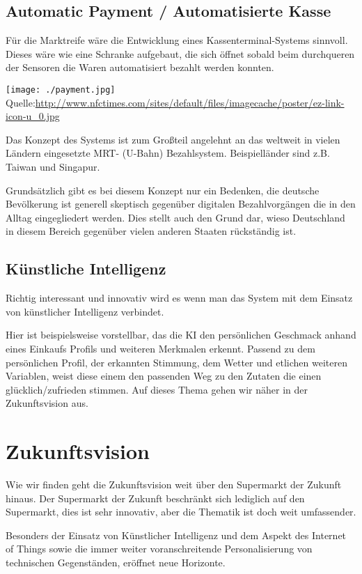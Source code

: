 \documentclass{sigchi}
\begin{document}
\subsection{Automatic Payment / Automatisierte Kasse}
Für die Marktreife wäre die Entwicklung eines Kassenterminal-Systems sinnvoll.
Dieses wäre wie eine Schranke aufgebaut, die sich öffnet sobald beim durchqueren der Sensoren die Waren automatisiert bezahlt werden konnten.

\texttt{[image: ./payment.jpg]}
Quelle:\url{http://www.nfctimes.com/sites/default/files/imagecache/poster/ez-link-icon-u_0.jpg}

Das Konzept des Systems ist zum Großteil angelehnt an das weltweit in vielen Ländern eingesetzte MRT- (U-Bahn) Bezahlsystem.
Beispielländer sind z.B. Taiwan und Singapur.

Grundsätzlich gibt es bei diesem Konzept nur ein Bedenken, die deutsche Bevölkerung ist generell skeptisch gegenüber digitalen Bezahlvorgängen die in den Alltag eingegliedert werden. Dies stellt auch den Grund dar, wieso Deutschland in diesem Bereich gegenüber vielen anderen Staaten rückständig ist.

\subsection{Künstliche Intelligenz}
Richtig interessant und innovativ wird es wenn man das System mit dem Einsatz von künstlicher Intelligenz verbindet.

Hier ist beispielsweise vorstellbar, das die KI den persönlichen Geschmack anhand eines Einkaufs Profils und weiteren Merkmalen erkennt. Passend zu dem persönlichen Profil, der erkannten Stimmung, dem Wetter und etlichen weiteren Variablen, weist diese einem den passenden Weg zu den Zutaten die einen glücklich/zufrieden stimmen.
Auf dieses Thema gehen wir näher in der Zukunftsvision aus.

\section{Zukunftsvision}
Wie wir finden geht die Zukunftsvision weit über den Supermarkt der Zukunft hinaus.
Der Supermarkt der Zukunft beschränkt sich lediglich auf den Supermarkt, dies ist sehr innovativ, aber die Thematik ist doch weit umfassender.

Besonders der Einsatz von Künstlicher Intelligenz und dem Aspekt des Internet of Things sowie die immer weiter voranschreitende Personalisierung von technischen Gegenständen, eröffnet neue Horizonte.
\end{document}
